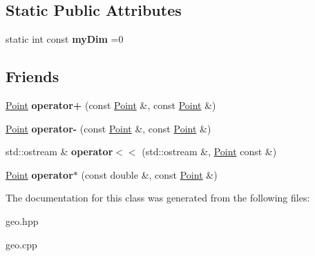 \subsection*{Static Public Attributes}
\begin{DoxyCompactItemize}
\item 
\hypertarget{classGeometry_1_1Point_a01abe5aeb25d0fd9b46e272f18776a3f}{static int const {\bfseries my\-Dim} =0}\label{classGeometry_1_1Point_a01abe5aeb25d0fd9b46e272f18776a3f}

\end{DoxyCompactItemize}
\subsection*{Friends}
\begin{DoxyCompactItemize}
\item 
\hypertarget{classGeometry_1_1Point_a379ea470d116d5ec7858c3b1c88051fa}{\hyperlink{classGeometry_1_1Point}{Point} {\bfseries operator+} (const \hyperlink{classGeometry_1_1Point}{Point} \&, const \hyperlink{classGeometry_1_1Point}{Point} \&)}\label{classGeometry_1_1Point_a379ea470d116d5ec7858c3b1c88051fa}

\item 
\hypertarget{classGeometry_1_1Point_adc0ae410968ebfcac79ebcf9d4eb3f5b}{\hyperlink{classGeometry_1_1Point}{Point} {\bfseries operator-\/} (const \hyperlink{classGeometry_1_1Point}{Point} \&, const \hyperlink{classGeometry_1_1Point}{Point} \&)}\label{classGeometry_1_1Point_adc0ae410968ebfcac79ebcf9d4eb3f5b}

\item 
\hypertarget{classGeometry_1_1Point_a692915697028be8bb3f8039965abbca7}{std\-::ostream \& {\bfseries operator$<$$<$} (std\-::ostream \&, \hyperlink{classGeometry_1_1Point}{Point} const \&)}\label{classGeometry_1_1Point_a692915697028be8bb3f8039965abbca7}

\item 
\hypertarget{classGeometry_1_1Point_a4796c5e216ac1d96d9b87714d1f9563c}{\hyperlink{classGeometry_1_1Point}{Point} {\bfseries operator$\ast$} (const double \&, const \hyperlink{classGeometry_1_1Point}{Point} \&)}\label{classGeometry_1_1Point_a4796c5e216ac1d96d9b87714d1f9563c}

\end{DoxyCompactItemize}


The documentation for this class was generated from the following files\-:\begin{DoxyCompactItemize}
\item 
geo.\-hpp\item 
geo.\-cpp\end{DoxyCompactItemize}
